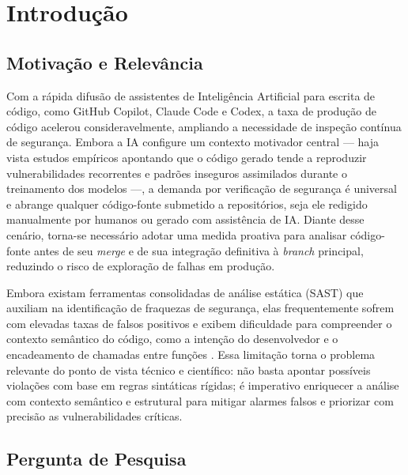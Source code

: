 \chapter{Introdução}
\label{cap:introducao}


\section{Motivação e Relevância}

Com a rápida difusão de assistentes de Inteligência Artificial para escrita de código, como GitHub Copilot, Claude Code e Codex, a taxa de produção de código acelerou consideravelmente, ampliando a necessidade de inspeção contínua de segurança. Embora a IA configure um contexto motivador central --- haja vista estudos empíricos apontando que o código gerado tende a reproduzir vulnerabilidades recorrentes e padrões inseguros assimilados durante o treinamento dos modelos ---, a demanda por verificação de segurança é universal e abrange qualquer código-fonte submetido a repositórios, seja ele redigido manualmente por humanos ou gerado com assistência de IA. Diante desse cenário, torna-se necessário adotar uma medida proativa para analisar código-fonte antes de seu \textit{merge} e de sua integração definitiva à \textit{branch} principal, reduzindo o risco de exploração de falhas em produção.

Embora existam ferramentas consolidadas de análise estática (SAST) que auxiliam na identificação de fraquezas de segurança, elas frequentemente sofrem com elevadas taxas de falsos positivos e exibem dificuldade para compreender o contexto semântico do código, como a intenção do desenvolvedor e o encadeamento de chamadas entre funções \cite{techscience2025,yang2025}. Essa limitação torna o problema relevante do ponto de vista técnico e científico: não basta apontar possíveis violações com base em regras sintáticas rígidas; é imperativo enriquecer a análise com contexto semântico e estrutural para mitigar alarmes falsos e priorizar com precisão as vulnerabilidades críticas.

\section{Pergunta de Pesquisa}

